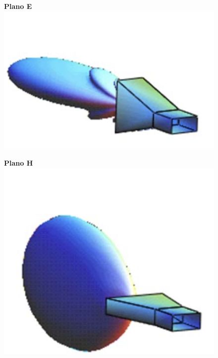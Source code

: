 \documentclass[twocolumn, 8pt]{extarticle}
\begin{document}
\begin{multicols}{2}
    \begin{figure}[H]
        \centering
        \textbf{Plano E}
        \includegraphics[width=\columnwidth]{bocina_e.png}
    \end{figure}

    \begin{figure}[H]
        \centering
        \textbf{Plano H}
        \includegraphics[width=\columnwidth]{bocina_h.png}
    \end{figure}
\end{multicols}
\end{document}
